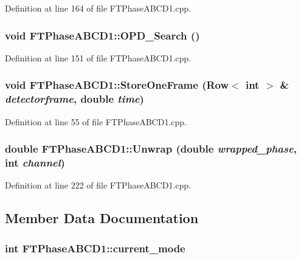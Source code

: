 Definition at line 164 of file FTPhaseABCD1.cpp.

\hypertarget{classFTPhaseABCD1_a16dbd37c05bd96bebab3a22d8e98fd5d}{
\subsubsection[{OPD\_\-Search}]{\setlength{\rightskip}{0pt plus 5cm}void FTPhaseABCD1::OPD\_\-Search ()}}
\label{classFTPhaseABCD1_a16dbd37c05bd96bebab3a22d8e98fd5d}


Definition at line 151 of file FTPhaseABCD1.cpp.

\hypertarget{classFTPhaseABCD1_a3af0de42c400aeed38d77b2edf0e77e7}{
\subsubsection[{StoreOneFrame}]{\setlength{\rightskip}{0pt plus 5cm}void FTPhaseABCD1::StoreOneFrame ({\bf Row}$<$ int $>$ \& {\em detectorframe}, \/  double {\em time})}}
\label{classFTPhaseABCD1_a3af0de42c400aeed38d77b2edf0e77e7}


Definition at line 55 of file FTPhaseABCD1.cpp.

\hypertarget{classFTPhaseABCD1_ad0d37735d29375d33bf1f9e5f349a706}{
\subsubsection[{Unwrap}]{\setlength{\rightskip}{0pt plus 5cm}double FTPhaseABCD1::Unwrap (double {\em wrapped\_\-phase}, \/  int {\em channel})}}
\label{classFTPhaseABCD1_ad0d37735d29375d33bf1f9e5f349a706}


Definition at line 222 of file FTPhaseABCD1.cpp.



\subsection{Member Data Documentation}
\hypertarget{classFTPhaseABCD1_aaec9fb5aee6e1d1e188fe7f1fffbe7d4}{
\subsubsection[{current\_\-mode}]{\setlength{\rightskip}{0pt plus 5cm}int {\bf FTPhaseABCD1::current\_\-mode}}}
\label{classFTPhaseABCD1_aaec9fb5aee6e1d1e188fe7f1fffbe7d4}



